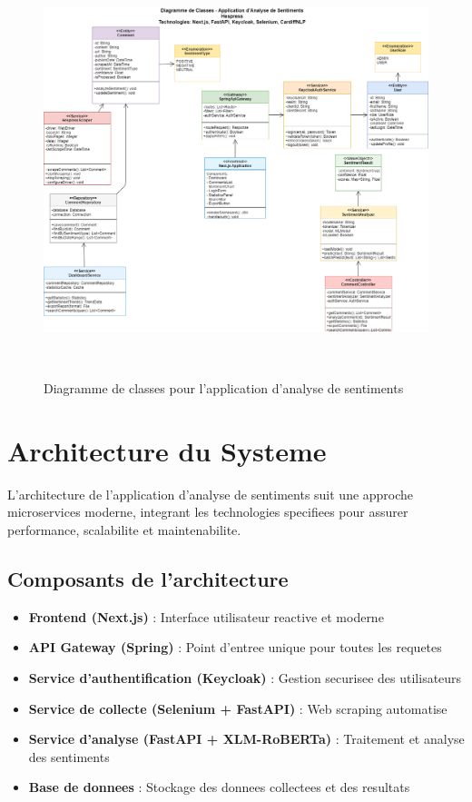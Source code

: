 \begin{figure}[H]
\centering
\includegraphics[height=12cm , width=\textwidth]{assets/images/class.png}
\caption{Diagramme de classes pour l'application d'analyse de sentiments}
\label{fig:class-global}
\end{figure}

\section{Architecture du Systeme}

L'architecture de l'application d'analyse de sentiments suit une approche microservices moderne, integrant les technologies specifiees pour assurer performance, scalabilite et maintenabilite.


\subsection{Composants de l'architecture}

\begin{itemize}
    \item \textbf{Frontend (Next.js)} : Interface utilisateur reactive et moderne
    \item \textbf{API Gateway (Spring)} : Point d'entree unique pour toutes les requetes
    \item \textbf{Service d'authentification (Keycloak)} : Gestion securisee des utilisateurs
    \item \textbf{Service de collecte (Selenium + FastAPI)} : Web scraping automatise
    \item \textbf{Service d'analyse (FastAPI + XLM-RoBERTa)} : Traitement et analyse des sentiments
    \item \textbf{Base de donnees} : Stockage des donnees collectees et des resultats
\end{itemize}

